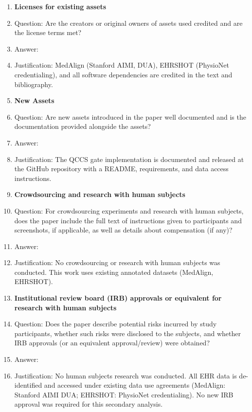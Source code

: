 \documentclass{article}
\begin{document}
\begin{enumerate}
\item {\bf Licenses for existing assets}
  \item[] Question: Are the creators or original owners of assets used
    credited and are the license terms met?
  \item[] Answer: \answerYes{}
  \item[] Justification: MedAlign (Stanford AIMI, DUA), EHRSHOT (PhysioNet
    credentialing), and all software dependencies are credited in the text
    and bibliography.

\item {\bf New Assets}
  \item[] Question: Are new assets introduced in the paper well documented
    and is the documentation provided alongside the assets?
  \item[] Answer: \answerYes{}
  \item[] Justification: The QCCS gate implementation is documented and
    released at the GitHub repository with a README, requirements, and
    data access instructions.

\item {\bf Crowdsourcing and research with human subjects}
  \item[] Question: For crowdsourcing experiments and research with human
    subjects, does the paper include the full text of instructions given to
    participants and screenshots, if applicable, as well as details about
    compensation (if any)?
  \item[] Answer: \answerNA{}
  \item[] Justification: No crowdsourcing or research with human subjects was
    conducted. This work uses existing annotated datasets (MedAlign, EHRSHOT).

\item {\bf Institutional review board (IRB) approvals or equivalent for research with human subjects}
  \item[] Question: Does the paper describe potential risks incurred by study
    participants, whether such risks were disclosed to the subjects, and whether
    IRB approvals (or an equivalent approval/review) were obtained?
  \item[] Answer: \answerNA{}
  \item[] Justification: No human subjects research was conducted. All EHR
    data is de-identified and accessed under existing data use agreements
    (MedAlign: Stanford AIMI DUA; EHRSHOT: PhysioNet credentialing). No new
    IRB approval was required for this secondary analysis.


\end{enumerate}
\end{document}
